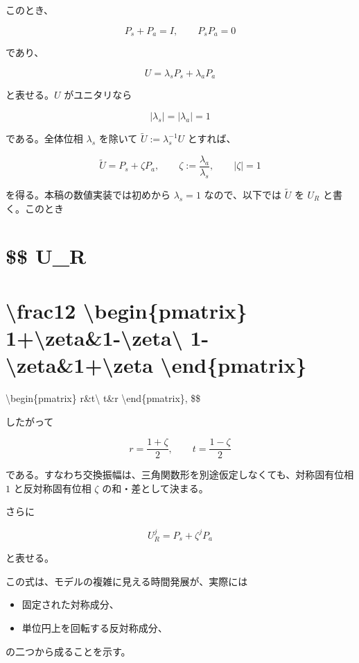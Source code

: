 \documentclass[
  a4paper,
  10pt]{article}
\providecommand{\tightlist}{%
  \setlength{\itemsep}{0pt}\setlength{\parskip}{0pt}}
\begin{document}
このとき、

\[
P_s+P_a=I,
\qquad
P_sP_a=0
\]

であり、

\[
U=\lambda_sP_s+\lambda_aP_a
\]

と表せる。\(U\) がユニタリなら

\[
|\lambda_s|=|\lambda_a|=1
\]

である。全体位相 \(\lambda_s\) を除いて
\(\widetilde U:=\lambda_s^{-1}U\) とすれば、

\[
\boxed{
\widetilde U=P_s+\zeta P_a,
\qquad
\zeta:=\frac{\lambda_a}{\lambda_s},
\qquad
|\zeta|=1
}
\]

を得る。本稿の数値実装では初めから \(\lambda_s=1\) なので、以下では
\(\widetilde U\) を \(U_R\) と書く。このとき

\section{\$\$ U\_R}\label{-u_r}

\section{\textbackslash frac12 \textbackslash begin\{pmatrix\}
1+\textbackslash zeta\&1-\textbackslash zeta\textbackslash{}
1-\textbackslash zeta\&1+\textbackslash zeta
\textbackslash end\{pmatrix\}}\label{frac12-beginpmatrix-1zeta1-zeta-1-zeta1zeta-endpmatrix}

\textbackslash begin\{pmatrix\} r\&t\textbackslash{} t\&r
\textbackslash end\{pmatrix\}, \$\$

したがって

\[
\boxed{
r=\frac{1+\zeta}{2},
\qquad
t=\frac{1-\zeta}{2}
}
\]

である。すなわち交換振幅は、三角関数形を別途仮定しなくても、対称固有位相
\(1\) と反対称固有位相 \(\zeta\) の和・差として決まる。

さらに

\[
\boxed{
U_R^j=P_s+\zeta^jP_a
}
\]

と表せる。

この式は、モデルの複雑に見える時間発展が、実際には

\begin{itemize}
\tightlist
\item
  固定された対称成分、
\item
  単位円上を回転する反対称成分、
\end{itemize}

の二つから成ることを示す。
\end{document}
